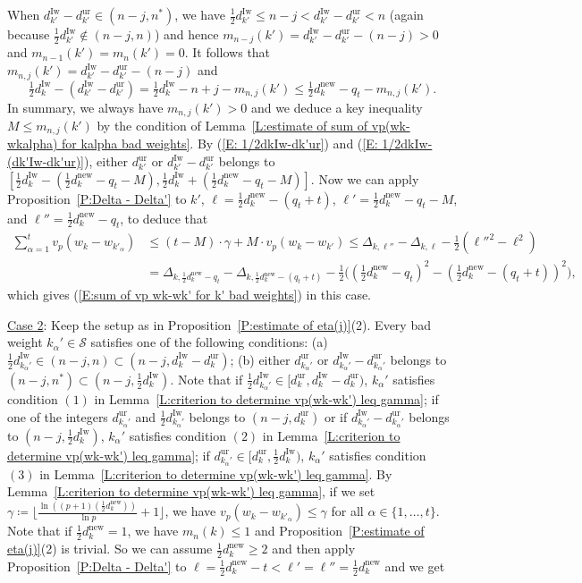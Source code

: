 \documentclass[12pt]{amsart}
\theoremstyle{definition}
\numberwithin{equation}{subsection}
\def\calS{\mathcal{S}}
\newcommand{\new}{\mathrm{new}}
\newcommand{\Iw}{\mathrm{Iw}}
\newcommand{\ur}{\mathrm{ur}}
\begin{document}
\begin{enumerate}[(a)]
				When $d_{k'}^\Iw-d_{k'}^\ur\in (n-j,n^\ast)$, we have $\frac 12 d_{k'}^\Iw\leq n-j<d_{k'}^\Iw-d_{k'}^\ur<n$  (again because $\frac 12d_{k'}^\Iw \not\in (n-j,n)$) and hence $m_{n-j}(k')=d_{k'}^\Iw-d_{k'}^\ur-(n-j)>0$ and $m_{n-1}(k')=m_n(k')=0$. It follows that $m_{n,j}(k')=d_{k'}^\Iw-d_{k'}^\ur-(n-j)$ and
				\begin{equation}
				\label{E: 1/2dkIw-(dk'Iw-dk'ur)}
				\tfrac 12 d_k^\Iw-(d_{k'}^\Iw-d_{k'}^\ur)=\tfrac 12 d_k^\Iw-n+j-m_{n,j}(k')\leq \tfrac 12 d_k^\new -q_t-m_{n,j}(k').
				\end{equation}
In summary, we always have $m_{n,j}(k')>0$ and we deduce a key inequality $M\leq m_{n,j}(k')$ by the condition of Lemma~\ref{L:estimate of sum of vp(wk-wkalpha) for kalpha bad weights}. By (\ref{E: 1/2dkIw-dk'ur}) and (\ref{E: 1/2dkIw-(dk'Iw-dk'ur)}), either $d_{k'}^\ur$ or $d_{k'}^\Iw-d_{k'}^\ur$ belongs to $[\frac 12 d_k^\Iw-(\frac 12 d_k^\new-q_t-M),\frac 12 d_k^\Iw+(\frac 12 d_k^\new-q_t-M)]$. Now we can apply Proposition~\ref{P:Delta - Delta'} to $k'$, $\ell=\frac 12 d_k^\new -(q_t+t)$, $\ell'=\frac 12 d_k^\new -q_t-M$, and $\ell''=\frac 12 d_k^\new-q_t$, to deduce that
				\begin{align*}
				\sum_{\alpha=1}^t v_p(w_k-w_{k'_\alpha})&\leq (t-M)\cdot \gamma+M\cdot v_p(w_k-w_{k'})\leq \Delta_{k,\ell''}-\Delta_{k,\ell}-\tfrac 12 (\ell''^2-\ell^2)\\
				&=\Delta_{k,\frac 12 d_k^\new-q_t}-\Delta_{k,\frac 12 d_k^\new-(q_t+t)}-\tfrac 12\big((\tfrac 12d_k^\new-q_t)^2-(\tfrac 12d_k^\new- (q_t+t))^2 \big),
				\end{align*}
				which gives (\ref{E:sum of vp wk-wk' for k' bad weights}) in this case.
			\end{enumerate}
\underline{Case 2}: Keep the setup as in Proposition~\ref{P:estimate of eta(j)}(2). Every bad weight $k_\alpha'\in \calS$ satisfies one of the following conditions: (a) $\tfrac 12 d_{k_\alpha'}^\Iw\in (n-j,n)\subset (n-j,d_k^\Iw-d_k^\ur)$; (b) either $d_{k_\alpha'}^\ur$ or $d_{k_\alpha'}^\Iw-d_{k_\alpha'}^\ur$ belongs to $(n-j,n^\ast)\subset (n-j, \tfrac 12 d_k^\Iw)$. Note that if $\tfrac 12 d_{k_\alpha'}^\Iw\in [d_k^\ur, d_k^\Iw-d_k^\ur)$, $k_\alpha'$ satisfies condition $(1)$ in Lemma~\ref{L:criterion to determine vp(wk-wk') leq gamma}; if one of the integers $d_{k_\alpha'}^\ur$ and $\tfrac 12 d_{k_\alpha'}^\Iw$ belongs to $(n-j, d_k^\ur)$ or if $d_{k_\alpha'}^\Iw-d_{k_\alpha'}^\ur$ belongs to $(n-j,\tfrac 12 d_k^\Iw)$, $k_\alpha'$ satisfies condition $(2)$ in Lemma~\ref{L:criterion to determine vp(wk-wk') leq gamma}; if $d_{k_\alpha'}^\ur\in [d_k^\ur, \tfrac 12 d_k^\Iw)$, $k_\alpha'$ satisfies condition $(3)$ in Lemma~\ref{L:criterion to determine vp(wk-wk') leq gamma}. By Lemma~\ref{L:criterion to determine vp(wk-wk') leq gamma}, if we set $\gamma\coloneqq \big\lfloor \frac{\ln ((p+1)(\frac 12 d_k^\new))}{\ln p}+1 \big\rfloor$,  we have $v_p(w_k-w_{k'_\alpha})\leq \gamma$ for all $\alpha\in \{1,\dots, t \}$. Note that if $\frac 12 d_k^\new =1$, we have $m_n(k)\leq 1$ and Proposition~\ref{P:estimate of eta(j)}(2) is trivial. So we can assume $\tfrac 12 d_k^\new\geq 2$ and then apply Proposition~\ref{P:Delta - Delta'} to $\ell=\frac 12 d_k^\new-t<\ell'=\ell''=\frac 12 d_k^\new$ and we get 
\end{document}
